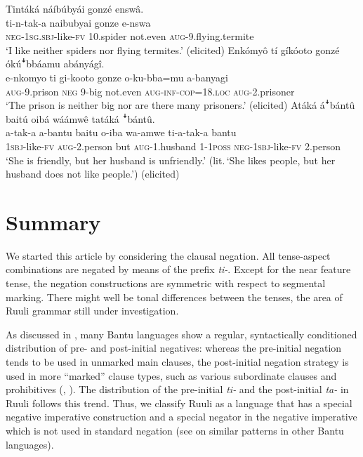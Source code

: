 \documentclass[output=paper,colorlinks,citecolor=brown,draftmode]{langscibook}
\begin{document}
\ea \label{ex:complex}
\begin{xlist}
\ex \label{ex:nominalcoord}
	\glll   Tintáká náíbúbyái gonzé enswâ.\\
	        ti-n-tak-a naibubyai gonze e-nswa\\
	    	\textsc{neg}-1\textsc{sg.sbj}-like-\textsc{fv} 10.spider not.even \textsc{aug}-9.flying.termite\\
	\glt ‘I like neither spiders nor flying termites.’ (elicited)
\ex \label{ex:clausecoord}
	\glll   Enkómyô tí gíkóoto gonzé ókúꜜbbáamu  abányágî.\\
	        e-nkomyo ti gi-kooto gonze o-ku-bba=mu a-banyagi\\
	    	\textsc{aug}-9.prison \textsc{neg} 9-big not.even \textsc{aug}-\textsc{inf}-\textsc{cop}=18.\textsc{loc} \textsc{aug}-2.prisoner\\
	\glt ‘The prison is neither big nor are there many prisoners.’  (elicited)
\ex \label{ex:but}
	\glll   Atáká áꜜbántû baitú oibá wáámwê tatáká ꜜbántû.\\
	        a-tak-a a-bantu baitu o-iba wa-amwe ti-a-tak-a bantu\\
	    	\textsc{1sbj}-like-\textsc{fv} \textsc{aug}-2.person but \textsc{aug}-1.husband 1-1\textsc{poss} \textsc{neg}-\textsc{1sbj}-like-\textsc{fv} 2.person\\
	\glt ‘She is friendly, but her husband is unfriendly.’ (lit.\,`She likes people, but her husband does not like people.')  (elicited)
\end{xlist}
\z

\section{Summary} 
We started this article by considering the clausal negation. 
All tense-aspect combinations are negated by means of the prefix \textit{ti-}. 
Except for the near feature tense, the negation constructions are symmetric with respect to segmental marking. 
There might well be tonal differences between the tenses, the area of Ruuli grammar still under investigation.

As discussed in , many Bantu languages show a regular, syntactically conditioned distribution of pre- and post-initial negatives: whereas the pre-initial negation tends to be used in unmarked main clauses, the post-initial negation strategy is used in more “marked” clause types, such as various subordinate clauses and prohibitives (\citealt[261–279, 305–308]{Güldemann1996}, \citeyear[551–564]{Güldemann1999}). 
The distribution of the pre-initial \emph{ti-} and the post-initial \emph{ta-} in Ruuli follows this trend.
Thus, we classify Ruuli as a language that has a special negative imperative construction and a special negator in the negative imperative which is not used in standard negation (see \citealt{DevosVanOlmen2013} on similar patterns in other Bantu languages). 
\end{document}
